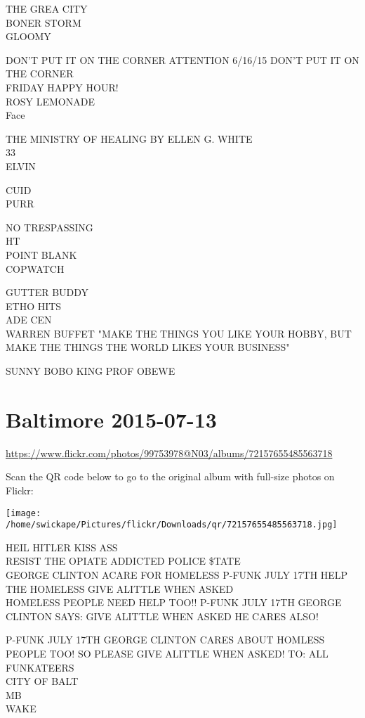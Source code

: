 \documentclass[10pt,letterpaper]{article}
\begin{document}
THE GREA CITY\\
BONER STORM\\
GLOOMY

DON'T PUT IT ON THE CORNER ATTENTION 6/16/15 DON'T PUT IT ON THE CORNER\\
FRIDAY HAPPY HOUR!\\
ROSY LEMONADE\\
Face

THE MINISTRY OF HEALING BY ELLEN G. WHITE\\
33\\
ELVIN

CUID\\
PURR

NO TRESPASSING\\
HT\\
POINT BLANK\\
COPWATCH

GUTTER BUDDY\\
ETHO HITS\\
ADE CEN\\
WARREN BUFFET "MAKE THE THINGS YOU LIKE YOUR HOBBY, BUT MAKE THE THINGS THE WORLD LIKES YOUR BUSINESS"

SUNNY BOBO KING PROF OBEWE
\pagebreak

\section*{Baltimore 2015-07-13}

\url{https://www.flickr.com/photos/99753978@N03/albums/72157655485563718}

Scan the QR code below to go to the original album with full-size photos on Flickr:

\texttt{[image: /home/swickape/Pictures/flickr/Downloads/qr/72157655485563718.jpg]}
\pagebreak

HEIL HITLER KISS ASS\\
RESIST THE OPIATE ADDICTED POLICE \$TATE\\
GEORGE CLINTON ACARE FOR HOMELESS P{-}FUNK JULY 17TH HELP THE HOMELESS GIVE ALITTLE WHEN ASKED\\
HOMELESS PEOPLE NEED HELP TOO!! P{-}FUNK JULY 17TH GEORGE CLINTON SAYS: GIVE ALITTLE WHEN ASKED HE CARES ALSO!

P{-}FUNK JULY 17TH GEORGE CLINTON CARES ABOUT HOMLESS PEOPLE TOO!  SO PLEASE GIVE ALITTLE WHEN ASKED!  TO: ALL FUNKATEERS\\
CITY OF BALT\\
MB\\
WAKE
\end{document}
